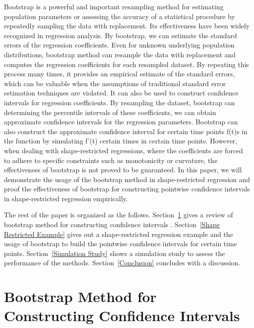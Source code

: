 \documentclass[12pt]{article}
\begin{document}
Bootstrap is a powerful and important resampling method for estimating 
population parameters or assessing the accuracy of a statistical procedure 
by repeatedly sampling the data with replacement. Its effectiveness have 
been widely recognized in regression analysis. By bootstrap, we can estimate 
the standard errors of the regression coefficients. Even for unknown 
underlying population distributions, bootstrap method can resample the data 
with replacement and computes the regression coefficients for each resampled
dataset. By repeating this process many times, it provides an empirical 
estimate of the standard errors, which can be valuable when the assumptions 
of traditional standard error estimation techniques are violated. It can 
also be used to construct confidence intervals for regression coefficients.
By resampling the dataset, bootstrap can determining the percentile intervals
of these coefficients, we can obtain approximate confidence intervals for 
the regression parameters. Bootstrap can also construct the approximate 
confidence interval for certain time points f(t)s in the function by 
simulating f'(t) certain times in certain time points. However, when dealing
with shape-restricted regressions, where the coefficients are forced to adhere
to specific constraints such as monotonicity or curvature, the effectiveness
of bootstrap is not proved to be guaranteed. In this paper, we will 
demonstrate the usage of the bootstrap method in shape-restricted regression 
and proof the effectiveness of bootstrap for constructing pointwise confidence
intervals in shape-restricted regression empirically.

The rest of the paper is organized as the follows. 
Section~\ref{Bootstrap Method for Constructing Confidence Intervals}
gives a review of bootstrap method for constructing confidence intervals
. Section~\ref{Shape Restricted Example} gives out a shape-restricted regression
example and the usage of bootstrap to build the pointwise confidence intervals
for certain time points. Section~\ref{Simulation Study} shows a simulation 
study to assess the performance of the methods. 
Section~\ref{Conclusion} concludes with a discussion.




\section{Bootstrap Method for Constructing Confidence Intervals}
\label{Bootstrap Method for Constructing Confidence Intervals}
\end{document}
